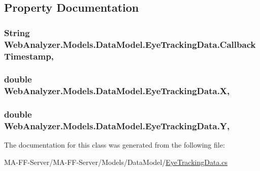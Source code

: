\subsection{Property Documentation}
\hypertarget{class_web_analyzer_1_1_models_1_1_data_model_1_1_eye_tracking_data_a2e2cc407404ad7cd9fbd75be533d5967}{}
\subsubsection[{Callback\+Timestamp}]{\setlength{\rightskip}{0pt plus 5cm}String Web\+Analyzer.\+Models.\+Data\+Model.\+Eye\+Tracking\+Data.\+Callback\+Timestamp\hspace{0.3cm}{\ttfamily [get]}, {\ttfamily [set]}}\label{class_web_analyzer_1_1_models_1_1_data_model_1_1_eye_tracking_data_a2e2cc407404ad7cd9fbd75be533d5967}
\hypertarget{class_web_analyzer_1_1_models_1_1_data_model_1_1_eye_tracking_data_afc6ab652582e4aaccb30d64fb58a2a0c}{}
\subsubsection[{X}]{\setlength{\rightskip}{0pt plus 5cm}double Web\+Analyzer.\+Models.\+Data\+Model.\+Eye\+Tracking\+Data.\+X\hspace{0.3cm}{\ttfamily [get]}, {\ttfamily [set]}}\label{class_web_analyzer_1_1_models_1_1_data_model_1_1_eye_tracking_data_afc6ab652582e4aaccb30d64fb58a2a0c}
\hypertarget{class_web_analyzer_1_1_models_1_1_data_model_1_1_eye_tracking_data_a2b76ad3ab08710a4ef0ecf42c6b6a8f3}{}
\subsubsection[{Y}]{\setlength{\rightskip}{0pt plus 5cm}double Web\+Analyzer.\+Models.\+Data\+Model.\+Eye\+Tracking\+Data.\+Y\hspace{0.3cm}{\ttfamily [get]}, {\ttfamily [set]}}\label{class_web_analyzer_1_1_models_1_1_data_model_1_1_eye_tracking_data_a2b76ad3ab08710a4ef0ecf42c6b6a8f3}


The documentation for this class was generated from the following file\+:\begin{DoxyCompactItemize}
\item 
M\+A-\/\+F\+F-\/\+Server/\+M\+A-\/\+F\+F-\/\+Server/\+Models/\+Data\+Model/\hyperlink{_eye_tracking_data_8cs}{Eye\+Tracking\+Data.\+cs}\end{DoxyCompactItemize}
